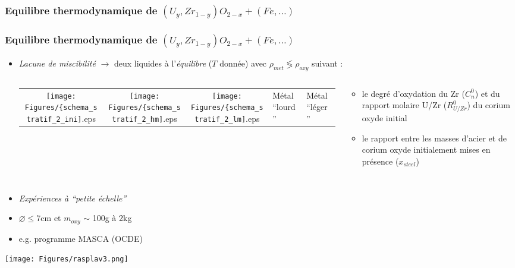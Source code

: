 \subsubsection{Equilibre thermodynamique de $\left(U_y,Zr_{1-y}\right)O_{2-x}+\left(Fe, \dots\right)$}
\begin{frame}
\frametitle{Equilibre thermodynamique de $\left(U_y,Zr_{1-y}\right)O_{2-x}+\left(Fe, \dots\right)$}
      \begin{itemize}
\item \emph{Lacune de miscibilité} $\rightarrow$ deux liquides à l'\emph{équilibre} ($T$ donnée) avec \emph{$\rho_{met}\lessgtr \rho_{oxy}$} suivant :
\begin{columns}[T]
  \begin{column}{0.35\textwidth}
    \begin{tabularx}{\textwidth}{CCC}
    \texttt{[image: Figures/\{schema\_stratif\_2\_ini]}.eps} & 
    \texttt{[image: Figures/\{schema\_stratif\_2\_hm]}.eps} &
    \texttt{[image: Figures/\{schema\_stratif\_2\_lm]}.eps} \n
    \tiny Etat initial & \tiny Métal ``lourd'' & \tiny Métal ``léger''
    \end{tabularx}
  \end{column}
  \begin{column}{0.65\textwidth} 
  \begin{itemize}
    \item le degré d’oxydation du Zr ($C_n^0$) et du rapport molaire U/Zr ($R_{U/Zr}^0$) du corium oxyde initial
    \item le rapport entre les masses d'acier et de corium oxyde initialement mises en présence ($x_{steel}$)
  \end{itemize}
  \end{column}
\end{columns}
\end{itemize}
\begin{columns}[T]
  \begin{column}{0.35\textwidth}
  \begin{itemize}
    \item \emph{Expériences à ``petite échelle''}
    \item $\diameter \le 7$cm et $m_{oxy}$ $\sim$ 100g à 2kg
    \item e.g. programme MASCA (OCDE) \cite{Tsurikov2007}
  \end{itemize}
  \texttt{[image: Figures/rasplav3.png]} 
  \end{column}

\end{columns}
\end{frame}
